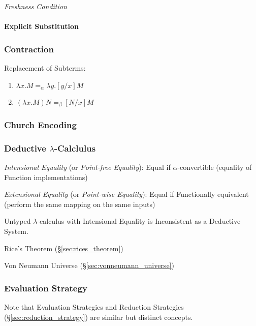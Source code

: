 \emph{Freshness Condition}



\paragraph{Explicit Substitution}\label{sec:explicit_substitution}\hfill



\subsubsection{Contraction}\label{sec:contraction}\cite{seldin03}

Replacement of Subterms:
\begin{enumerate}
  \item $\lambda x . M =_\alpha \lambda y . [y/x]M$
  \item $(\lambda x . M)N =_\beta [N/x]M$
\end{enumerate}



\subsubsection{Church Encoding}\label{sec:church_encoding}

\subsubsection{Deductive $\lambda$-Calclulus}\label{sec:deductive_lambda}

\emph{Intensional Equality} (or \emph{Point-free Equality}): Equal if
$\alpha$-convertible (equality of Function implementations)

\emph{Extensional Equality} (or \emph{Point-wise Equality}): Equal if
Functionally equivalent (perform the same mapping on the same inputs)

Untyped $\lambda$-calculus with Intensional Equality is Inconsistent
as a Deductive System.

Rice's Theorem (\S\ref{sec:rices_theorem})

Von Neumann Universe (\S\ref{sec:vonneumann_universe})



\subsubsection{Evaluation Strategy}\label{sec:evaluation_strategy}

\fist Note that Evaluation Strategies and Reduction Strategies
(\S\ref{sec:reduction_strategy}) are similar but distinct concepts.

